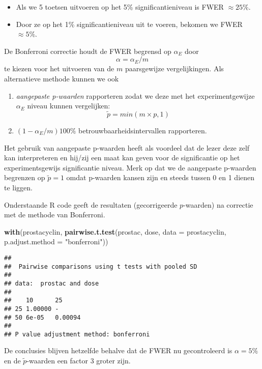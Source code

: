 \documentclass[12pt,dutch,coursenotes]{book}
\newenvironment{Shaded}{\begin{snugshade}}{\end{snugshade}}
\newcommand{\KeywordTok}[1]{\textcolor[rgb]{0.13,0.29,0.53}{\textbf{#1}}}
\newcommand{\DataTypeTok}[1]{\textcolor[rgb]{0.13,0.29,0.53}{#1}}
\newcommand{\StringTok}[1]{\textcolor[rgb]{0.31,0.60,0.02}{#1}}
\newcommand{\NormalTok}[1]{#1}
\providecommand{\tightlist}{%
  \setlength{\itemsep}{0pt}\setlength{\parskip}{0pt}}
\theoremstyle{definition}
\theoremstyle{definition}
\theoremstyle{definition}
\theoremstyle{remark}
\begin{document}
\begin{itemize}
\tightlist
\item
  Als we 5 toetsen uitvoeren op het 5\% significantieniveau is FWER
  \(\approx 25\%\).
\item
  Door ze op het 1\% significantieniveau uit te voeren, bekomen we FWER
  \(\approx 5\%\).
\end{itemize}

De Bonferroni correctie houdt de FWER begrensd op \(\alpha_E\) door
\[\alpha=\alpha_E/m\] te kiezen voor het uitvoeren van de \(m\)
paarsgewijze vergelijkingen. Als alternatieve methode kunnen we ook

\begin{enumerate}
\def\labelenumi{\arabic{enumi}.}
\tightlist
\item
  \emph{aangepaste p-waarden} rapporteren zodat we deze met het
  experimentgewijze \(\alpha_E\) niveau kunnen vergelijken:
  \[\tilde{p}=min(m\times p,1)\]
\item
  \((1-\alpha_E/m)100\%\) betrouwbaarheidsintervallen rapporteren.
\end{enumerate}

Het gebruik van aangepaste p-waarden heeft als voordeel dat de lezer
deze zelf kan interpreteren en hij/zij een maat kan geven voor de
significantie op het experimentsgewijs significantie niveau. Merk op dat
we de aangepaste p-waarden begrenzen op \(\tilde{p}=1\) omdat p-waarden
kansen zijn en steeds tussen 0 en 1 dienen te liggen.

Onderstaande R code geeft de resultaten (gecorrigeerde \(p\)-waarden) na
correctie met de methode van Bonferroni.

\begin{Shaded}
\begin{Highlighting}[]
\KeywordTok{with}\NormalTok{(prostacyclin, }\KeywordTok{pairwise.t.test}\NormalTok{(prostac, dose, }\DataTypeTok{data =}\NormalTok{ prostacyclin, }
    \DataTypeTok{p.adjust.method =} \StringTok{"bonferroni"}\NormalTok{))}
\end{Highlighting}
\end{Shaded}

\begin{verbatim}
## 
##  Pairwise comparisons using t tests with pooled SD 
## 
## data:  prostac and dose 
## 
##    10      25     
## 25 1.00000 -      
## 50 6e-05   0.00094
## 
## P value adjustment method: bonferroni
\end{verbatim}

De conclusies blijven hetzelfde behalve dat de FWER nu gecontroleerd is
\(\alpha=5\%\) en de \(\tilde{p}\)-waarden een factor 3 groter zijn.
\end{document}
